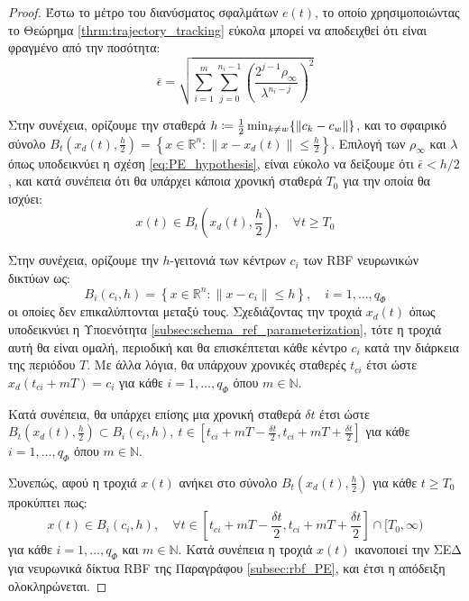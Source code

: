 \begin{proof}
Έστω το μέτρο του διανύσματος σφαλμάτων $e(t)$, το οποίο χρησιμοποιώντας το Θεώρημα \ref{thrm:trajectory_tracking} εύκολα μπορεί να αποδειχθεί ότι είναι φραγμένο από την ποσότητα:
\begin{equation*}
\bar{\epsilon} = 
\sqrt{\sum_{i = 1}^{m}\sum_{j = 0}^{n_i-1}     
	\left( \frac{2^{j-1} \rho_{\infty} }{\lambda^{n_i - j}} \right)^2}  
\end{equation*}

Στην συνέχεια, ορίζουμε την σταθερά $h \coloneqq \frac{1}{2} \min_{k \neq w} \{ \norm{c_k - c_w}\} $, και το σφαιρικό σύνολο $B_t(x_d(t), \frac{h}{2}) = \left\{ x \in\mathbb{R}^n : \| x - x_d(t) \| \leq \frac{h}{2} \right\}$. Επιλογή των $\rho_{\infty}$ και $\lambda$ όπως υποδεικνύει η σχέση \eqref{eq:PE_hypothesis}, είναι εύκολο να δείξουμε ότι $\bar{\epsilon} < h/2$, και κατά συνέπεια ότι θα υπάρχει κάποια χρονική σταθερά $T_0$ για την οποία θα ισχύει:
\begin{equation*}
	x(t) \in B_t\left( x_d(t), \frac{h}{2} \right), \quad \forall t \geq T_0
\end{equation*}

Στην συνέχεια, ορίζουμε την $h$-γειτονιά των κέντρων $c_i$ των RBF νευρωνικών δικτύων ως:
\begin{equation*}
	B_i(c_i,h) = 
	\left\{ x \in\mathbb{R}^n : \| x - c_i \| \leq h \right\}, \quad i = 1,\dots, q_\Phi
\end{equation*}
οι οποίες δεν επικαλύπτονται μεταξύ τους. Σχεδιάζοντας την τροχιά $x_d(t)$ όπως υποδεικνύει η Υποενότητα \ref{subsec:schema_ref_parameterization}, τότε η τροχιά αυτή θα είναι ομαλή, περιοδική και θα επισκέπτεται κάθε κέντρο $c_i$ κατά την διάρκεια της περιόδου $T$. Με άλλα λόγια, θα υπάρχουν χρονικές σταθερές $t_{ci}$ έτσι ώστε $x_d(t_{ci} + mT) = c_i$ για κάθε $i = 1,\dots,q_\Phi$ όπου $m \in \mathbb{N}$.

Κατά συνέπεια, θα υπάρχει επίσης μια χρονική σταθερά $\delta t$ έτσι ώστε $B_t(x_d(t), \frac{h}{2}) \subset B_i(c_i,h), \: 
t \in [t_{ci} +mT - \frac{\delta t}{2},t_{ci} +mT + \frac{\delta t}{2}]$ για κάθε $i = 1,\dots,q_\Phi$ όπου $m \in \mathbb{N}$.

Συνεπώς, αφού η τροχιά $x(t)$ ανήκει στο σύνολο $B_t(x_d(t), \frac{h}{2})$ για κάθε $t \geq T_0$ προκύπτει πως:
\begin{equation*}
x(t) \in B_i(c_i,h), \quad \forall t \in [t_{ci} +mT - \frac{\delta t}{2},t_{ci} +mT + \frac{\delta t}{2}] \cap [T_0,\infty)
\end{equation*}
για κάθε $i = 1,\dots,q_\Phi$ και $m \in \mathbb{N}$. Κατά συνέπεια η τροχιά $x(t)$ ικανοποιεί την ΣΕΔ για νευρωνικά δίκτυα RBF της Παραγράφου \ref{subsec:rbf_PE}, και έτσι η απόδειξη ολοκληρώνεται.


\end{proof}
